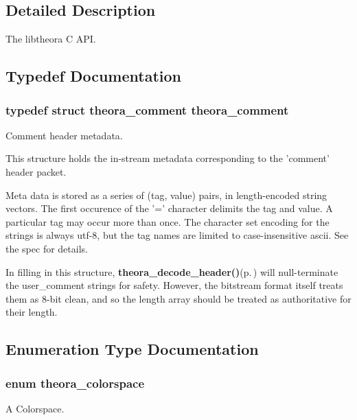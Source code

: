 \subsection{Detailed Description}
The libtheora C API. 



\subsection{Typedef Documentation}
\subsubsection{\setlength{\rightskip}{0pt plus 5cm}typedef struct {\bf theora\_\-comment}  {\bf theora\_\-comment}}\label{theora_8h_a9}


Comment header metadata. 

This structure holds the in-stream metadata corresponding to the 'comment' header packet.

Meta data is stored as a series of (tag, value) pairs, in length-encoded string vectors. The first occurence of the '=' character delimits the tag and value. A particular tag may occur more than once. The character set encoding for the strings is always utf-8, but the tag names are limited to case-insensitive ascii. See the spec for details.

In filling in this structure, {\bf theora\_\-decode\_\-header()}{\rm (p.\,\pageref{theora_8h_a21})} will null-terminate the user\_\-comment strings for safety. However, the bitstream format itself treats them as 8-bit clean, and so the length array should be treated as authoritative for their length. 

\subsection{Enumeration Type Documentation}
\subsubsection{\setlength{\rightskip}{0pt plus 5cm}enum {\bf theora\_\-colorspace}}\label{theora_8h_a38}


A Colorspace. 


